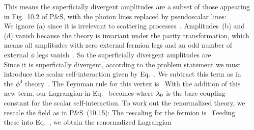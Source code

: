 \documentclass[11pt]{article}
\begin{document}
{	This means the superficially divergent amplitudes are a subset of those appearing in Fig.~10.2 of P\&S, with the photon lines replaced by pseudoscalar lines: \\[-4ex]
	We ignore (a) since it is irrelevant to scattering processes~\cite[pp.~317--318]{Peskin}.  Amplitudes~(b) and (d) vanish because the theory is invariant under the parity transformation, which means all amplitudes with zero external fermion legs and an odd number of external $\phi$ legs vanish~\cite[pp.~318, 323--324]{Peskin}.  So the superficially divergent amplitudes are \\[-3ex]
	  Since it is superficially divergent, according to the problem statement  we must introduce the scalar self-interaction given by Eq.~.  We subtract this term as in the $\phi^4$ theory~\cite[p.~324]{Peskin}.  The Feynman rule for this vertex is~\cite[p.~325]{Peskin}
	With the addition of this new term, our Lagrangian in Eq.~ becomes
	where $\lambda_0$ is the bare coupling constant for the scalar self-interaction.  To work out the renormalized theory, we rescale the field as in P\&S~(10.15):
	The rescaling for the fermion is~\cite[p.~330]{Peskin}
	Feeding these into Eq.~, we obtain the renormalized Lagrangian~\cite[p.~324]{Peskin}
	}
\end{document}
